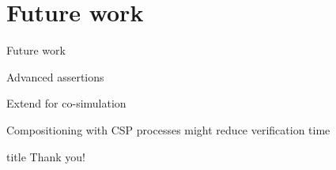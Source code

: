 \documentclass[11pt]{beamer}
\begin{document}
\section{Future work}
%
\begin{frame}{Future work}

\begin{block}{}
Advanced assertions
\end{block}

\pause

\begin{block}{}
Extend for co-simulation
\end{block}

\pause

\begin{block}{}
Compositioning with CSP processes might reduce verification time
\end{block}


\end{frame}

%
  \begin{frame}
  \vfill
  \centering
  \begin{beamercolorbox}[sep=8pt,center,shadow=true,rounded=true]{title}
    Thank you!\par%
  \end{beamercolorbox}
  \vfill
  \end{frame}
\end{document}
